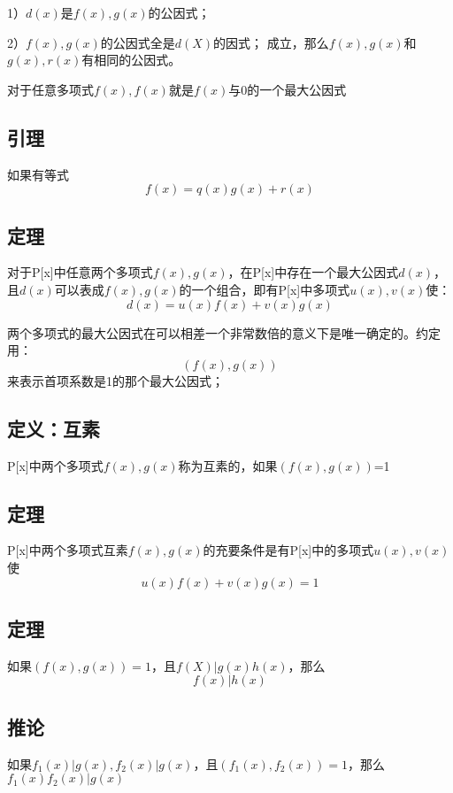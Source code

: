 \documentclass{article}%
\begin{document}
1）$d(x)$是$f(x),g(x)$的公因式；

2）$f(x),g(x)$的公因式全是$d(X)$的因式；
成立，那么$f(x),g(x)$和$g(x),r(x)$有相同的公因式。
\\ \hspace*{\fill}

对于任意多项式$f(x),f(x)$就是$f(x)$与0的一个最大公因式

\subsection{引理}
如果有等式
\begin{equation*}
	f(x)=q(x)g(x)+r(x)
\end{equation*}

\subsection{定理}
对于P[x]中任意两个多项式$f(x),g(x)$，在P[x]中存在一个最大公因式$d(x)$，且$d(x)$可以表成$f(x),g(x)$的一个组合，即有P[x]中多项式$u(x),v(x)$使：
\begin{equation*}
	d(x)=u(x)f(x)+v(x)g(x)
\end{equation*}

两个多项式的最大公因式在可以相差一个非常数倍的意义下是唯一确定的。约定用：
\[
(f(x),g(x))
\]
来表示首项系数是1的那个最大公因式；

\subsection{定义：互素}
P[x]中两个多项式$f(x),g(x)$称为互素的，如果$(f(x),g(x))$=1

\subsection{定理}
P[x]中两个多项式互素$f(x),g(x)$的充要条件是有P[x]中的多项式$u(x),v(x)$使
\[
u(x)f(x)+v(x)g(x)=1
\]

\subsection{定理}
如果$(f(x),g(x))=1$，且$f(X)|g(x)h(x)$，那么
\[
f(x)|h(x)
\]

\subsection{推论}
如果$f_1(x)|g(x),f_2(x)|g(x)$，且$(f_1(x),f_2(x))=1$，那么$ f_1(x)f_2(x)|g(x) $
\end{document}

